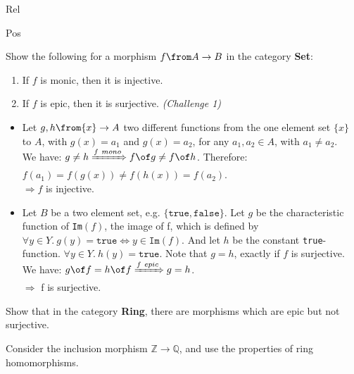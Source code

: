 \begin {definition}{Rel}
\begin{definition}{Pos}
\begin{exercise}
  Show the following for a morphism $f \from A \to B$ in the category \textbf{Set}:
  \begin{enumerate}
  \item If $f$ is monic, then it is injective.
  \item If $f$ is epic, then it is surjective. \textit{(Challenge 1)}
  \end{enumerate}
\end{exercise}

\begin{answer}
  \begin{itemize}
  \item Let $g,h \from \{x\} \to A$ two different functions
    from the one element set
    $\{x\}$ to $A$, with $g(x) = a_1$ and $g(x) = a_2$,
    for any $a_1,a_2 \in A$, with $a_1 \neq a_2$.\\
    We have: $g \neq h \xRightarrow{f \ mono} f \of g \neq f \of h$.
    Therefore: $f(a_1) = f(g(x)) \neq f(h(x)) = f(a_2)$.\\
    $\Rightarrow f$ is injective.
  \item Let $B$ be a two element set, e.g.
    $\{ \texttt{true}, \texttt{false}\}$.
    Let $g$ be the characteristic function of \texttt{Im}$(f)$,
    the image of f, which is defined by
    $\forall y \in Y. \ g(y) = \texttt{true}
    \Leftrightarrow y \in \texttt{Im}(f)$.
    And let $h$ be the constant \texttt{true}-function.
    $\forall y \in Y. \ h(y) = \texttt{true}$.
    Note that $g = h$, exactly if $f$ is surjective.\\
    We have: $g \of f = h \of f \xRightarrow{f \ epic} g = h$.\\
    $\Rightarrow$ f is surjective.
  \end{itemize}
\end{answer}

\begin{exercise}[Challenge 2]
  Show that in the category \textbf{Ring}, there are morphisms which are epic but not surjective.
  \begin{hint}
    Consider the inclusion morphism $\mathbb{Z} \to \mathbb{Q}$, and use the properties of ring homomorphisms.
  \end{hint}
\end{exercise}


\end{definition}
\end{definition}

